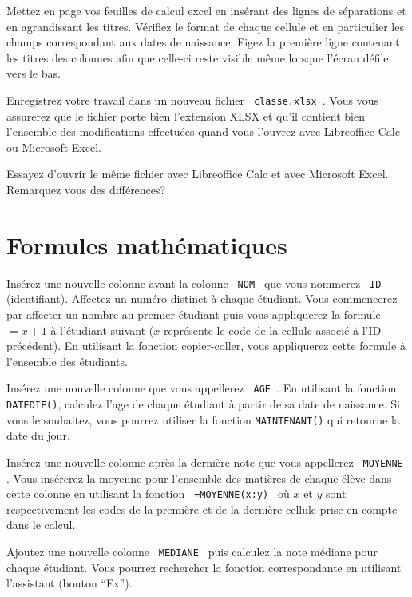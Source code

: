 \documentclass[a4paper, 8pt]{article}
\begin{document}
\exost Mettez en page vos feuilles de calcul excel en ins\'erant des lignes de s\'eparations et en agrandissant les titres.
V\'erifiez le format de chaque cellule et en particulier les champs correspondant aux dates de naissance.
Figez la premi\`ere ligne contenant les titres des colonnes afin que celle-ci reste visible m\^eme lorsque l'\'ecran d\'efile vers le bas.

\exost Enregistrez votre travail dans un nouveau fichier \verb? classe.xlsx ?. Vous vous assurerez que le fichier porte bien l'extension
XLSX et qu'il contient bien l'ensemble des modifications effectu\'ees quand vous l'ouvrez avec Libreoffice Calc ou Microsoft Excel.

\exost Essayez d'ouvrir le m\^eme fichier avec Libreoffice Calc et avec Microsoft Excel. Remarquez vous des diff\'erences?

\clearpage

\section{Formules math\'ematiques} %

\exost Ins\'erez une nouvelle colonne avant la colonne \verb? NOM ? que vous nommerez \verb? ID ? (identifiant).
Affectez un num\'ero distinct \`a chaque \'etudiant. Vous commencerez par affecter un nombre au premier \'etudiant
puis vous appliquerez la formule $=x+1$ \`a l'\'etudiant suivant ($x$ repr\'esente le code de la cellule associ\'e \`a l'ID pr\'ec\'edent).
En utilisant la fonction copier-coller, vous appliquerez cette formule \`a l'ensemble des \'etudiants.

\exost Ins\'erez une nouvelle colonne que vous appellerez \verb? AGE ?. En utilisant la fonction \verb?DATEDIF()?,
calculez l'age de chaque \'etudiant \`a partir de sa date de naissance. Si vous le souhaitez, vous pourrez utiliser la fonction
\verb?MAINTENANT()? qui retourne la date du jour.

\exost Ins\'erez une nouvelle colonne apr\`es la derni\`ere note que vous appellerez \verb? MOYENNE ?. 
Vous ins\'ererez la moyenne pour l'ensemble des mati\`eres de chaque \'el\`eve dans cette colonne en utilisant 
la fonction \verb? =MOYENNE(x:y) ? o\`u $x$ et $y$ sont respectivement les codes de la premi\`ere et de la derni\`ere 
cellule prise en compte dans le calcul.

\exost Ajoutez une nouvelle colonne \verb? MEDIANE ? puis calculez la note m\'ediane pour chaque \'etudiant. 
Vous pourrez rechercher la fonction correspondante en utilisant l'assistant (bouton ``Fx'').
\end{document}
